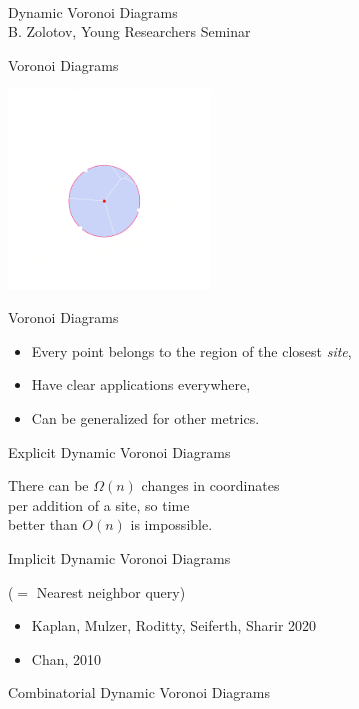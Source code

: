 \documentclass[17pt]{extarticle}
\newcommand{\newslide}[1]{\newpage \begin{center} \large #1 \end{center}}
\begin{document}
\ \\ [1cm]

\begin{center} {\Large Dynamic Voronoi Diagrams} \bigskip \\
	{\large B. Zolotov, Young Researchers Seminar} \end{center}

\newslide{Voronoi Diagrams} \vspace{-6mm}

\begin{center}
	\includegraphics[height=5.3cm]{figs/voronoiCircle-dark}
\end{center}

\newslide{Voronoi Diagrams}

\begin{itemize}
	\item Every point belongs to the region of the closest {\it site},
	\item Have clear applications everywhere,
	\item Can be generalized for other metrics.
\end{itemize}

\newslide{Explicit Dynamic Voronoi Diagrams}

There can be \(Ω (n)\) changes in coordinates \\
per addition of a site, so time \\
better than \(O (n)\) is impossible.

\newslide{Implicit Dynamic Voronoi Diagrams}

($=$ Nearest neighbor query)

\begin{itemize}
	\item Kaplan, Mulzer, Roditty, Seiferth, Sharir 2020
	\item Chan, 2010
\end{itemize}

\newslide{Combinatorial Dynamic Voronoi Diagrams}
\end{document}
